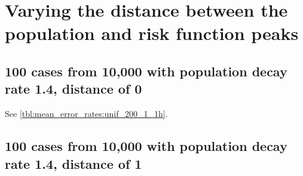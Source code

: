 \section{Varying the distance between the population and risk function peaks}

\subsection{100 cases from 10,000 with population decay rate 1.4, distance of 0}

See \autoref{tbl:mean_error_rates:unif_200_1_1h}.

\begin{table}[H]
\centering
\scriptsize

    \begin{subtable}{0.5\textwidth}
    
    \caption{Means} 
    \end{subtable}%
    \begin{subtable}{0.5\textwidth}
    
    \caption{Standard deviations} 
    \end{subtable}

\caption{Error rates for uniform population of 10,000, single peak intensity of factor 100 and decay rate 1.4, distance between population peak and risk peak is 0}
\label{tbl:mean_error_rates:p1.4_100_1_1h:2}
\end{table}

\subsection{100 cases from 10,000 with population decay rate 1.4, distance of 1}
\begin{table}[H]
\centering
\scriptsize

    \begin{subtable}{0.5\textwidth}
    
    \caption{Means} 
    \end{subtable}%
    \begin{subtable}{0.5\textwidth}
    
    \caption{Standard deviations} 
    \end{subtable}

\caption{Error rates for uniform population of 10,000, single peak intensity of factor 100 and decay rate 1.4, distance between population peak and risk peak is 1}
\label{tbl:mean_error_rates:p1.4_100_1_1h_1s}
\end{table}

